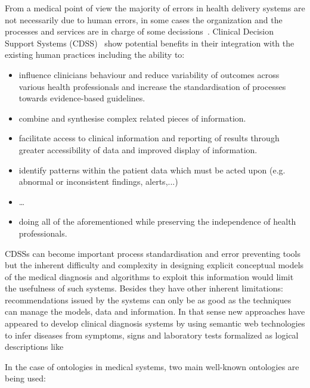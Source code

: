 From a medical point of view the majority of errors in health delivery
systems are not necessarily due to human errors, in some cases
the organization and the processes and services are in charge of
some decissions~\cite{Bouamrane:2010:EUO:1940334.1940339}. 
Clinical Decision Support Systems (CDSS)~\cite{citeulike:6634523,citeulike:7653300}
show potential benefits in their integration with the existing human
practices including the ability to:
\begin{itemize}
 \item influence clinicians behaviour and reduce variability of outcomes across
various health professionals and increase the standardisation of processes towards
evidence-based guidelines.
\item combine and synthesise complex related pieces of information.
\item facilitate access to clinical information and reporting of results through
greater accessibility of data and improved display of information.
\item identify patterns within the patient data which must be acted upon (e.g. abnormal or inconsistent findings, alerts,...)
\item \ldots
\item doing all of the aforementioned while preserving the independence of health professionals.
\end{itemize}

CDSSs can become important process standardisation and error preventing tools but
the inherent difficulty and complexity in designing explicit conceptual models of
the medical diagnosis and algorithms to exploit this information would limit the usefulness 
of such systems. Besides they have other inherent limitations: recommendations issued by the systems 
can only be as good as the techniques can manage the models, data and information. 
In that sense new approaches have appeared to develop clinical diagnosis systems 
by using semantic web technologies to infer diseases from symptoms, signs and laboratory tests 
formalized as logical descriptions like~\cite{DBLP:journals/eswa/Garcia-CrespoGMBP10,DBLP:conf/cbms/GonzalezGAGP09,DBLP:conf/etelemed/RodriguezMAPGA09}


In the case of ontologies in medical systems, two main well-known ontologies are being used:

